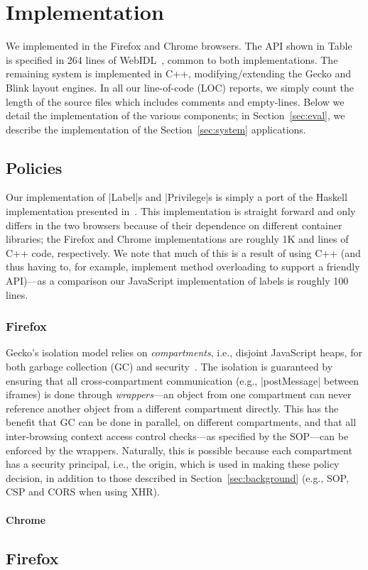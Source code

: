 \section{Implementation}
\label{sec:implementation}

We implemented \sys{} in the Firefox and Chrome browsers.
%
The API shown in Table~ is specified in 264
lines of WebIDL~\cite{webidl}, common to both
implementations.
%
The remaining system is implemented in C++, modifying/extending the
Gecko and Blink layout engines.
%
In all our line-of-code (LOC) reports, we simply count the length of
the source files which includes comments and empty-lines.
%
Below we detail the implementation of the various \sys{} components;
in Section~\ref{sec:eval}, we describe the implementation of the
Section~\ref{sec:system} applications.

\subsection{Policies}
%
Our implementation of \js|Label|s and \js|Privilege|s is simply a port
of the Haskell implementation presented
in~\cite{stefan:2011:dclabels,stefan:2011:flexible}. 
%
This implementation is straight forward and only differs in the two
browsers because of their dependence on different container libraries;
the Firefox and Chrome implementations are roughly 1K and 
lines of C++ code, respectively.
%
We note that much of this is a result of using C++ (and thus having
to, for example, implement method overloading to support a friendly
API)---as a comparison our JavaScript implementation of labels is
roughly 100 lines.
%

\subsubsection{Firefox}

Gecko's isolation model relies on \emph{compartments}, i.e., disjoint
JavaScript heaps, for both garbage collection (GC) and
security~.
%
The isolation is guaranteed by ensuring that all cross-compartment
communication (e.g., \js|postMessage| between iframes) is done through
\emph{wrappers}---an object from one compartment can never reference
another object from a different compartment directly.
%
This has the benefit that GC can be done in parallel, on different
compartments, and that all inter-browsing context access control
checks---as specified by the SOP---can be enforced by the wrappers.
%
Naturally, this is possible because each compartment has a security
principal, i.e., the origin, which is used in making these policy
decision, in addition to those described in
Section~\ref{sec:background} (e.g., SOP, CSP and CORS when using XHR).

\paragraph{Chrome}

\subsection{Firefox}
\label{sec:implementation:firefox}


